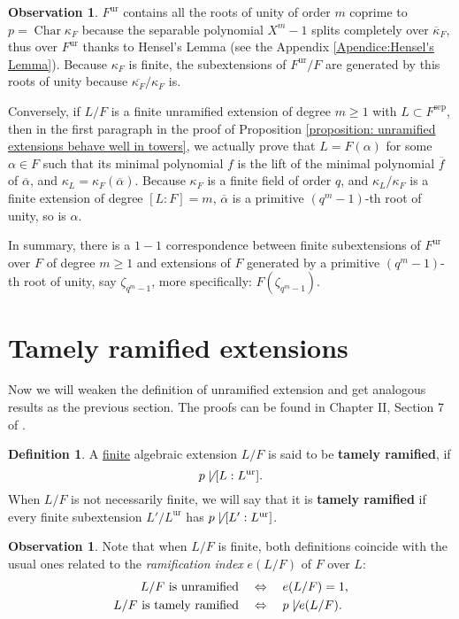 \documentclass[12pt]{article}
\theoremstyle{plain}
\theoremstyle{definition}
\newtheorem{definition}[theorem]{Definition}
\newtheorem{obs}[theorem]{Observation}
\renewcommand{\bar}[1]{\overline{#1}}
\newcommand{\Char}[1]{\operatorname{Char} #1}
\newcommand{\sep}[1]{{#1}^{\operatorname{sep}}}
\newcommand{\ur}[1]{{#1}^{\operatorname{ur}}}
\begin{document}
\begin{obs}\label{observation:urF is generated by all roots of unity of order m coprime to p}
$\ur F$ contains all the roots of unity of order $m$ coprime to $p = \Char \kappa_F$ because the separable polynomial $X^m - 1$ splits completely over $\bar \kappa_F$, thus over $\ur F$ thanks to Hensel's Lemma (see the Appendix \ref{Apendice:Hensel's Lemma}). Because $\kappa_F$ is finite, the subextensions of $\ur F / F$ are generated by this roots of unity because $\bar{\kappa_F} /\kappa_F$ is.

Conversely, if $L/F$ is a finite unramified extension of degree $m \geq 1$ with $L \subset \sep F$, then in the first paragraph in the proof of Proposition \ref{proposition: unramified extensions behave well in towers}, we actually prove that $L = F(\alpha)$ for some $\alpha \in F$ such that its minimal polynomial $f$ is the lift of the minimal polynomial $\bar f$ of $\bar \alpha$, and $\kappa_{L} = \kappa_F (\bar \alpha)$. Because $\kappa_F$ is a finite field of order $q$, and $\kappa_L / \kappa_F$ is a finite extension of degree $[L:F] = m$, $\bar \alpha$ is a primitive $(q^m-1)$-th root of unity, so is $\alpha$.

In summary, there is a $1-1$ correspondence between finite subextensions of $\ur F$ over $F$ of degree $m \geq 1$ and extensions of $F$ generated by a primitive $(q^m-1)$-th root of unity, say $\zeta_{q^m-1}$, more specifically: $F (\zeta_{q^{m}-1})$.
\end{obs}




\section{Tamely ramified extensions}


Now we will weaken the definition of unramified extension and get analogous results as the previous section. The proofs can be found in Chapter II, Section 7 of \cite{neukirch2013algebraicNumberTheory}.

\begin{definition}
A \underline{finite} algebraic extension $L/F$ is said to be \textbf{tamely ramified}, if
\[
    p \not \mid [L : \ur L].
\]
When $L/F$ is not necessarily finite, we will say that it is \textbf{tamely ramified} if every finite subextension $L' / \ur L$ has $p \not \mid [L' : \ur L]$.
\end{definition}

\begin{obs}
Note that when $L/F$ is finite, both definitions coincide with the usual ones related to the \textit{ramification index} $e(L/F)$ of $F$ over $L$:
\begin{align*}
L/F \text{ is unramified} \quad &\Leftrightarrow \quad e(L/F) = 1, \\
L/F \text{ is tamely ramified} \quad &\Leftrightarrow \quad p \not \mid e(L/F).
\end{align*}
\end{obs}
\end{document}
